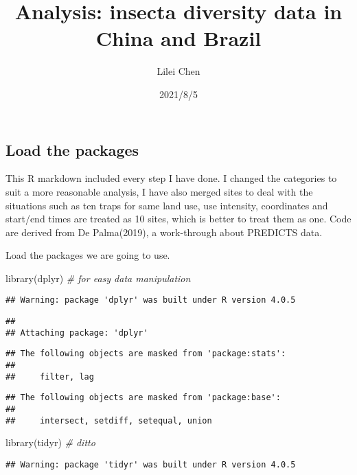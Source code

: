\documentclass[
]{article}
\title{Analysis: insecta diversity data in China and Brazil}
\author{Lilei Chen}
\date{2021/8/5}
\newenvironment{Shaded}{\begin{snugshade}}{\end{snugshade}}
\newcommand{\CommentTok}[1]{\textcolor[rgb]{0.56,0.35,0.01}{\textit{#1}}}
\newcommand{\FunctionTok}[1]{\textcolor[rgb]{0.00,0.00,0.00}{#1}}
\newcommand{\NormalTok}[1]{#1}
\begin{document}
\maketitle

\hypertarget{load-the-packages}{%
\subsection{Load the packages}\label{load-the-packages}}

This R markdown included every step I have done. I changed the
categories to suit a more reasonable analysis, I have also merged sites
to deal with the situations such as ten traps for same land use, use
intensity, coordinates and start/end times are treated as 10 sites,
which is better to treat them as one. Code are derived from De
Palma(2019), a work-through about PREDICTS data.

Load the packages we are going to use.

\begin{Shaded}
\begin{Highlighting}[]
\FunctionTok{library}\NormalTok{(dplyr) }\CommentTok{\# for easy data manipulation}
\end{Highlighting}
\end{Shaded}

\begin{verbatim}
## Warning: package 'dplyr' was built under R version 4.0.5
\end{verbatim}

\begin{verbatim}
## 
## Attaching package: 'dplyr'
\end{verbatim}

\begin{verbatim}
## The following objects are masked from 'package:stats':
## 
##     filter, lag
\end{verbatim}

\begin{verbatim}
## The following objects are masked from 'package:base':
## 
##     intersect, setdiff, setequal, union
\end{verbatim}

\begin{Shaded}
\begin{Highlighting}[]
\FunctionTok{library}\NormalTok{(tidyr) }\CommentTok{\# ditto}
\end{Highlighting}
\end{Shaded}

\begin{verbatim}
## Warning: package 'tidyr' was built under R version 4.0.5
\end{verbatim}
\end{document}
